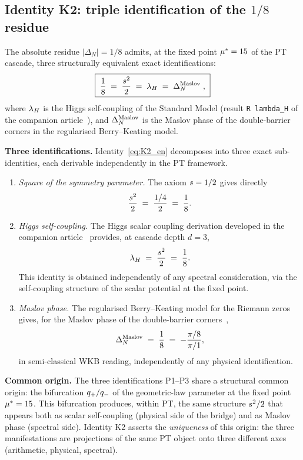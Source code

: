 \subsection{Identity K2: triple identification of the \texorpdfstring{$1/8$}{1/8} residue}
\label{sec:spectrales:K2}

\begin{theoreme}
\label{thm:K2_en}
The absolute residue $|\Delta_N| = 1/8$ admits, at the fixed point $\mu^{*} = 15$ of the PT cascade, three structurally equivalent exact identifications:
\begin{equation}
\boxed{\;
\dfrac{1}{8} \;=\; \dfrac{s^{2}}{2} \;=\; \lambda_H \;=\; \Delta_N^{\rm Maslov} \;,
\;}
\label{eq:K2_en}
\end{equation}
where $\lambda_H$ is the Higgs self-coupling of the Standard Model (result \texttt{R\,lambda\_H} of the companion article~\cite{companion_M5}), and $\Delta_N^{\rm Maslov}$ is the Maslov phase of the double-barrier corners in the regularised Berry--Keating model.
\end{theoreme}

\textbf{Three identifications.} Identity~\eqref{eq:K2_en} decomposes into three exact sub-identities, each derivable independently in the PT framework.
\begin{enumerate}[nosep,leftmargin=*,label=\textbf{P\arabic*.}]
\item \emph{Square of the symmetry parameter.} The axiom $s = 1/2$ gives directly
\[
\dfrac{s^{2}}{2} \;=\; \dfrac{1/4}{2} \;=\; \dfrac{1}{8}.
\]
\item \emph{Higgs self-coupling.} The Higgs scalar coupling derivation developed in the companion article~\cite{companion_M5} provides, at cascade depth $d = 3$,
\[
\lambda_H \;=\; \dfrac{s^{2}}{2} \;=\; \dfrac{1}{8}.
\]
This identity is obtained independently of any spectral consideration, via the self-coupling structure of the scalar potential at the fixed point.
\item \emph{Maslov phase.} The regularised Berry--Keating model for the Riemann zeros gives, for the Maslov phase of the double-barrier corners~\cite{BerryKeating1999},
\[
\Delta_N^{\rm Maslov} \;=\; \dfrac{1}{8} \;=\; -\dfrac{\pi/8}{\pi/1},
\]
in semi-classical WKB reading, independently of any physical identification.
\end{enumerate}

\textbf{Common origin.} The three identifications P1--P3 share a structural common origin: the bifurcation $q_{+} / q_{-}$ of the geometric-law parameter at the fixed point~$\mu^{*} = 15$. This bifurcation produces, within PT, the same structure $s^{2}/2$ that appears both as scalar self-coupling (physical side of the bridge) and as Maslov phase (spectral side). Identity K2 asserts the \emph{uniqueness} of this origin: the three manifestations are projections of the same PT object onto three different axes (arithmetic, physical, spectral).

